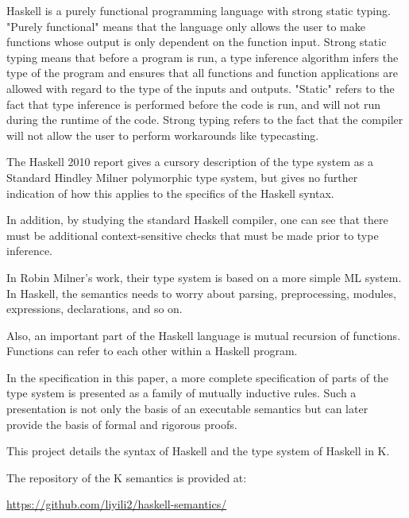 Haskell is a purely functional programming language with strong static typing. "Purely functional" means that the language only allows the user to make functions whose output is only dependent on the function input. Strong static typing means that before a program is run, a type inference algorithm infers the type of the program and ensures that all functions and function applications are allowed with regard to the type of the inputs and outputs. "Static" refers to the fact that type inference is performed before the code is run, and will not run during the runtime of the code. Strong typing refers to the fact that the compiler will not allow the user to perform workarounds like typecasting.

The Haskell 2010 report gives a cursory description of the type system as a Standard Hindley Milner polymorphic type system, but gives no further indication of how this applies to the specifics of the Haskell syntax.

In addition, by studying the standard Haskell compiler, one can see that there must be additional context-sensitive checks that must be made prior to type inference.

In Robin Milner's work, their type system is based on a more simple ML system. In Haskell, the semantics needs to worry about parsing, preprocessing, modules, expressions, declarations, and so on.

Also, an important part of the Haskell language is mutual recursion of functions. Functions can refer to each other within a Haskell program.

In the specification in this paper, a more complete specification of parts of the type system is presented as a family of mutually inductive rules. Such a presentation is not only the basis of an executable semantics but can later provide the basis of formal and rigorous proofs.

This project details the syntax of Haskell and the type system of Haskell in K.

The repository of the K semantics is provided at:

\url{https://github.com/liyili2/haskell-semantics/}